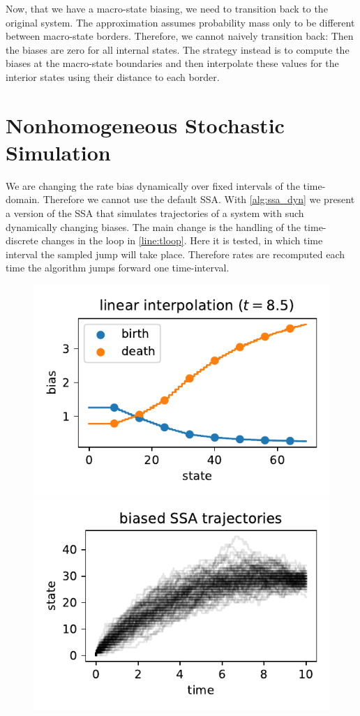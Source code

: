 Now, that we have a macro-state biasing, we need to transition back to the original system.
The approximation assumes probability mass only to be different between macro-state borders.
Therefore, we cannot naively transition back: Then the biases are zero for all internal states.
The strategy instead is to compute the biases at the macro-state boundaries and then interpolate these values for the interior states using their distance to each border.

\section{Nonhomogeneous Stochastic Simulation}
We are changing the rate bias dynamically over fixed intervals of the time-domain.
Therefore we cannot use the default \ac{SSA}.
With \autoref{alg:ssa_dyn} we present a version of the \acl{SSA} that simulates trajectories of a system with such dynamically changing biases.
The main change is the handling of the time-discrete changes in the loop in \autoref{line:tloop}.
Here it is tested, in which time interval the sampled jump will take place.
Therefore rates are recomputed each time the algorithm jumps forward one time-interval.
\begin{figure}
    \centering
    \includegraphics[scale=0.5]{gfx/lin_intp.pdf}
    \includegraphics[scale=0.5]{gfx/biased_SSA.pdf}
    \caption[Bias interpolation \& biased \ac{SSA}]{\label{fig:bias_ssa}}
\end{figure}

